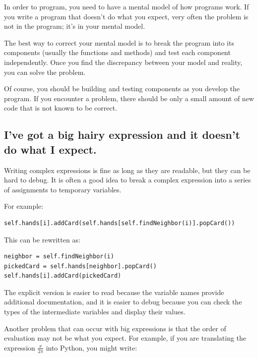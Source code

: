 \documentclass[10pt]{book}
\begin{document}
In order to program, you need to have a mental model of how
programs work.  If you write a program that doesn't do what you expect,
very often the problem is not in the program; it's in your mental
model.


The best way to correct your mental model is to break the program
into its components (usually the functions and methods) and test
each component independently.  Once you find the discrepancy
between your model and reality, you can solve the problem.

Of course, you should be building and testing components as you
develop the program.  If you encounter a problem,
there should be only a small amount of new code
that is not known to be correct.


\subsection{I've got a big hairy expression and it doesn't
do what I expect.}


Writing complex expressions is fine as long as they are readable,
but they can be hard to debug.  It is often a good idea to
break a complex expression into a series of assignments to
temporary variables.

For example:

\beforeverb
\begin{verbatim}
self.hands[i].addCard(self.hands[self.findNeighbor(i)].popCard())
\end{verbatim}
\afterverb
%
This can be rewritten as:

\beforeverb
\begin{verbatim}
neighbor = self.findNeighbor(i)
pickedCard = self.hands[neighbor].popCard()
self.hands[i].addCard(pickedCard)
\end{verbatim}
\afterverb
%
The explicit version is easier to read because the variable
names provide additional documentation, and it is easier to debug
because you can check the types of the intermediate variables
and display their values.


Another problem that can occur with big expressions is
that the order of evaluation may not be what you expect.
For example, if you are translating the expression
$\frac{x}{2 \pi}$ into Python, you might write:
\end{document}
